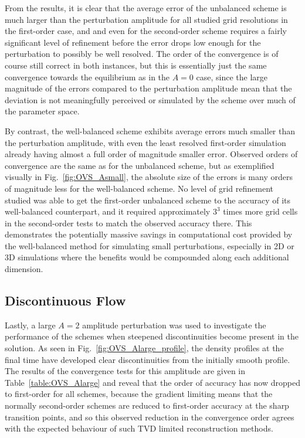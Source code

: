 From the results, it is clear that the average error of the unbalanced scheme is much larger than the perturbation amplitude for all studied grid resolutions in the first-order case, and and even for the second-order scheme requires a fairly significant level of refinement before the error drops low enough for the perturbation to possibly be well resolved. The order of the convergence is of course still correct in both instances, but this is essentially just the same convergence towards the equilibrium as in the $A=0$ case, since the large magnitude of the errors compared to the perturbation amplitude mean that the deviation is not meaningfully perceived or simulated by the scheme over much of the parameter space.

By contrast, the well-balanced scheme exhibits average errors much smaller than the perturbation amplitude, with even the least resolved first-order simulation already having almost a full order of magnitude smaller error. Observed orders of convergence are the same as for the unbalanced scheme, but as exemplified visually in Fig.~\ref{fig:OVS_Asmall}, the absolute size of the errors is many orders of magnitude less for the well-balanced scheme. No level of grid refinement studied was able to get the first-order unbalanced scheme to the accuracy of its well-balanced counterpart, and it required approximately $3^3$ times more grid cells in the second-order tests to match the observed accuracy there. This demonstrates the potentially massive savings in computational cost provided by the well-balanced method for simulating small perturbations, especially in 2D or 3D simulations where the benefits would be compounded along each additional dimension.

\subsection{Discontinuous Flow}

Lastly, a large $A=2$ amplitude perturbation was used to investigate the performance of the schemes when steepened discontinuities become present in the solution. As seen in Fig.~\ref{fig:OVS_Alarge_profile}, the density profiles at the final time have developed clear discontinuities from the initially smooth profile. The results of the convergence tests for this amplitude are given in Table~\ref{table:OVS_Alarge} and reveal that the order of accuracy has now dropped to first-order for all schemes, because the gradient limiting means that the normally second-order schemes are reduced to first-order accuracy at the sharp transition points, and so this observed reduction in the convergence order agrees with the expected behaviour of such TVD limited reconstruction methods.

